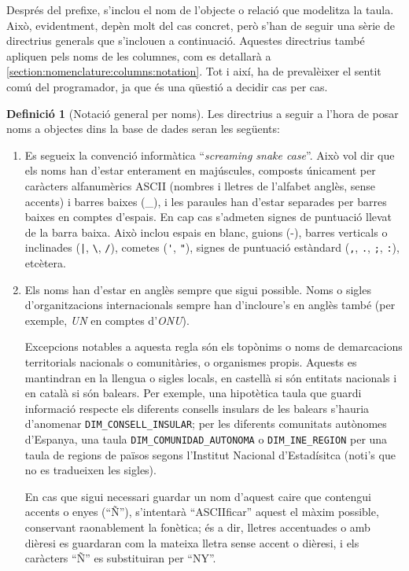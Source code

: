 \documentclass{article}
\theoremstyle{definition}
\newtheorem{definition}{Definició}
\begin{document}
Després del prefixe, s'inclou el nom de l'objecte o relació que modelitza la taula. Això, evidentment, depèn molt del cas concret, però s'han de seguir una sèrie de directrius generals que s'inclouen a continuació. Aquestes directrius també apliquen pels noms de les columnes, com es detallarà a \ref{section:nomenclature:columns:notation}. Tot i així, ha de prevalèixer el sentit comú del programador, ja que és una qüestió a decidir cas per cas.

\begin{definition}[Notació general per noms]\label{def:general:notation}
Les directrius a seguir a l'hora de posar noms a objectes dins la base de dades seran les següents:
\begin{enumerate}
  \item Es segueix la convenció informàtica ``\emph{screaming snake case}''. Això vol dir que els noms han d'estar enterament en majúscules, composts únicament per caràcters alfanumèrics ASCII (nombres i lletres de l'alfabet anglès, sense accents) i barres baixes (\_), i les paraules han d'estar separades per barres baixes en comptes d'espais. En cap cas s'admeten signes de puntuació llevat de la barra baixa. Això inclou espais en blanc, guions (-), barres verticals o inclinades (\verb'|', \verb|\|, \verb|/|), cometes (\verb|'|, \verb|"|), signes de puntuació estàndard (\verb|,|, \verb|.|, \verb|;|, \verb|:|), etcètera.

  \item Els noms han d'estar en anglès sempre que sigui possible. Noms o sigles d'organitzacions internacionals sempre han d'incloure's en anglès també (per exemple, \emph{UN} en comptes d'\emph{ONU}).

  Excepcions notables a aquesta regla són els topònims o noms de demarcacions territorials nacionals o comunitàries, o organismes propis. Aquests es mantindran en la llengua o sigles locals, en castellà si són entitats nacionals i en català si són balears. Per exemple, una hipotètica taula que guardi informació respecte els diferents consells insulars de les balears s'hauria d'anomenar \verb|DIM_CONSELL_INSULAR|; per les diferents comunitats autònomes d'Espanya, una taula \verb|DIM_COMUNIDAD_AUTONOMA| o \verb|DIM_INE_REGION| per una taula de regions de països segons l'Institut Nacional d'Estadísitca (noti's que no es tradueixen les sigles).

  En cas que sigui necessari guardar un nom d'aquest caire que contengui accents o enyes (``Ñ''), s'intentarà ``ASCIIficar'' aquest el màxim possible, conservant raonablement la fonètica; és a dir, lletres accentuades o amb dièresi es guardaran com la mateixa lletra sense accent o dièresi, i els caràcters ``Ñ'' es substituiran per ``NY''.


\end{enumerate}
\end{definition}
\end{document}
